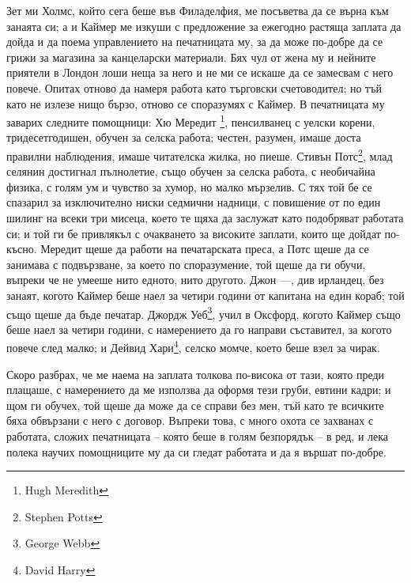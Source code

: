 \documentclass[12pt]{book}
\begin{document}
Зет ми Холмс, който сега беше във Филаделфия, ме посъветва да се върна към занаята си; а и Каймер ме изкуши с предложение за ежегодно растяща заплата да дойда и да поема управлението на печатницата му, за да може по-добре да се грижи за магазина за канцеларски материали. Бях чул от жена му и нейните приятели в Лондон лоши неща за него и не ми се искаше да се замесвам с него повече. Опитах отново да намеря работа като търговски счетоводител; но тъй като не излезе нищо бързо, отново се споразумях с Каймер. В печатницата му заварих следните помощници: Хю Мередит \footnote{Hugh Meredith}, пенсилванец с уелски корени, тридесетгодишен, обучен за селска работа; честен, разумен, имаше доста правилни наблюдения, имаше читателска жилка, но пиеше. Стивън Потс\footnote{Stephen Potts}, млад селянин достигнал пълнолетие, също обучен за селска работа, с необичайна физика, с голям ум и чувство за хумор, но малко мързелив. С тях той бе се спазарил за изключително ниски седмични надници, с повишение от по един шилинг на всеки три мисеца, което те щяха да заслужат като подобряват работата си; и той ги бе привлякъл с очакването за високите заплати, които ще дойдат по-късно. Мередит щеше да работи на печатарската преса, а Потс щеше да се занимава с подвързване, за което по споразумение, той щеше да ги обучи, въпреки че не умееше нито едното, нито другото. Джон ---, див ирландец, без занаят, когото Каймер беше наел за четири години от капитана на един кораб; той също щеше да бъде печатар. Джордж Уеб\footnote{George Webb}, учил в Оксфорд, когото Каймер също беше наел за четири години, с намерението да го направи съставител, за когото повече след малко; и Дейвид Хари\footnote{David Harry}, селско момче, което беше взел за чирак. 

Скоро разбрах, че ме наема на заплата толкова по-висока от тази, която преди плащаше, с намерението да ме използва да оформя тези груби, евтини кадри; и щом ги обучех, той щеше да може да се справи без мен, тъй като те всичките бяха обвързани с него с договор. Въпреки това, с много охота се захванах с работата, сложих печатницата – която беше в голям безпорядък – в ред, и лека полека научих помощниците му да си гледат работата и да я вършат по-добре. 
\end{document}
